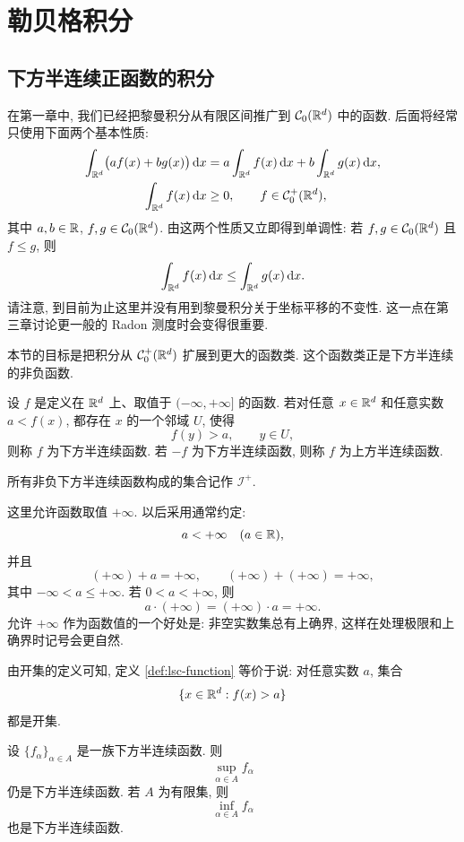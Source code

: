 \chapter{勒贝格积分}

\section{下方半连续正函数的积分}
\label{sec:lsc-positive-integral}

在第一章中, 我们已经把黎曼积分从有限区间推广到 \(\mathcal{C}_0(\mathbb{R}^d)\) 中的函数. 后面将经常只使用下面两个基本性质:
\begin{align}
	\int_{\mathbb{R}^d}\bigl(af(x)+bg(x)\bigr)\,\dd x
	&=a\int_{\mathbb{R}^d}f(x)\,\dd x
	+b\int_{\mathbb{R}^d}g(x)\,\dd x,
	\label{eq:c0-linear-lebesgue-start}\\
	\int_{\mathbb{R}^d}f(x)\,\dd x&\geq 0,
	\qquad f\in \mathcal{C}_0^+(\mathbb{R}^d),
	\label{eq:c0-positive-lebesgue-start}
\end{align}
其中 \(a,b\in\mathbb{R}\), \(f,g\in\mathcal{C}_0(\mathbb{R}^d)\). 由这两个性质又立即得到单调性: 若 \(f,g\in\mathcal{C}_0(\mathbb{R}^d)\) 且 \(f\leq g\), 则
\[
\int_{\mathbb{R}^d}f(x)\,\dd x
\leq
\int_{\mathbb{R}^d}g(x)\,\dd x.
\]
请注意, 到目前为止这里并没有用到黎曼积分关于坐标平移的不变性. 这一点在第三章讨论更一般的 Radon 测度时会变得很重要.

本节的目标是把积分从 \(\mathcal{C}_0^+(\mathbb{R}^d)\) 扩展到更大的函数类. 这个函数类正是下方半连续的非负函数.

\begin{defn}[下方半连续函数]
	\label{def:lsc-function}
	设 \(f\) 是定义在 \(\mathbb{R}^d\) 上、取值于 \((-\infty,+\infty]\) 的函数. 若对任意 \(x\in\mathbb{R}^d\) 和任意实数 \(a<f(x)\), 都存在 \(x\) 的一个邻域 \(U\), 使得
	\[
	f(y)>a,
	\qquad y\in U,
	\]
	则称 \(f\) 为下方半连续函数. 若 \(-f\) 为下方半连续函数, 则称 \(f\) 为上方半连续函数.
	
	所有非负下方半连续函数构成的集合记作 \(\mathcal I^+\).
\end{defn}

这里允许函数取值 \(+\infty\). 以后采用通常约定:
\[
a<+\infty \quad (a\in\mathbb{R}),
\]
并且
\[
(+\infty)+a=+\infty,
\qquad
(+\infty)+(+\infty)=+\infty,
\]
其中 \(-\infty<a\leq+\infty\). 若 \(0<a<+\infty\), 则
\[
a\cdot(+\infty)=(+\infty)\cdot a=+\infty.
\]
允许 \(+\infty\) 作为函数值的一个好处是: 非空实数集总有上确界, 这样在处理极限和上确界时记号会更自然.

由开集的定义可知, 定义 \ref{def:lsc-function} 等价于说: 对任意实数 \(a\), 集合
\[
\{x\in\mathbb{R}^d:f(x)>a\}
\]
都是开集.

\begin{lem}\label{lem:lsc-stability}
	设 \(\{f_\alpha\}_{\alpha\in A}\) 是一族下方半连续函数. 则
	\[
	\sup_{\alpha\in A}f_\alpha
	\]
	仍是下方半连续函数. 若 \(A\) 为有限集, 则
	\[
	\inf_{\alpha\in A}f_\alpha
	\]
	也是下方半连续函数.
\end{lem}

